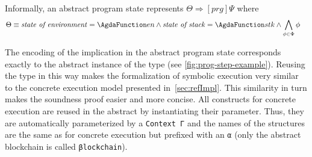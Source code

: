 \begin{comment}
  These rules never affect the goal formula to be asserted, and
  because (which must always be given), and $Ass$ can be any formula.
  Our construct specifys $Pre \Longrightarrow \langle p \rangle$ but
  not $Ass$ since it neither changes, nor has any implications for the
  validity of our rules \draft{other than the premisse holds with
    $Ass$ \emph{iff} the conclusion holds with it (i guess)}.

  This matches the sequent rule (R8) from \todo{cite lecture notes
    2010} for functional Michelson instructions, since here $x$ will
  be the new top stack element, which our DL always represents with a
  new variable, thus $\phi_x^{\hat{x}} \equiv \phi$.  \todo{not sure
    about control flow instructions \ldots}

  We will proof the soundness of these rules by showing that if an
  interpretation for $Pre$ is a valid interpretation for a concrete
  execution state with $i ; p$ left to be executed (i.e. stack values
  match and $Pre$ otherwise doesn't contradict itself), we can give an
  extension of that interpretation such that $I \land Pre'$ is a valid
  interpretation of the concrete state after execution of $i$.

  Since the extension of the interpretation is only for possible new
  variables that are not present in $Ass$, it follows from our
  soundness proof \draft{that our calculus is sound \ldots}.
\end{comment}

Informally, an abstract program state
represents $\Theta \Longrightarrow [ prg ] \Psi$ where
\begin{align*}
	\Theta&\equiv	\text{\emph{state of environment}} = \AFun{en}
\land	\text{\emph{state of stack}} = \AFun{stk}
\land	\bigwedge_{\phi \in \Phi} \phi
\end{align*}

The encoding of the implication in the abstract program state
corresponds exactly to the abstract instance of the 
 type (see \autoref{fig:prog-step-example}). Reusing the type in this way makes the
formalization of symbolic execution very similar to the concrete
execution model presented in~\autoref{sec:refImpl}.
This similarity in turn makes the soundness proof easier and more concise.
All constructs for concrete execution are reused in the abstract by
instantiating their  parameter.
Thus, they  are automatically parameterized by a \verb/Context Γ/ and the names of the
structures are the same as for concrete execution but prefixed with an \verb/α/
(only the abstract blockchain is called \verb/βlockchain/).


